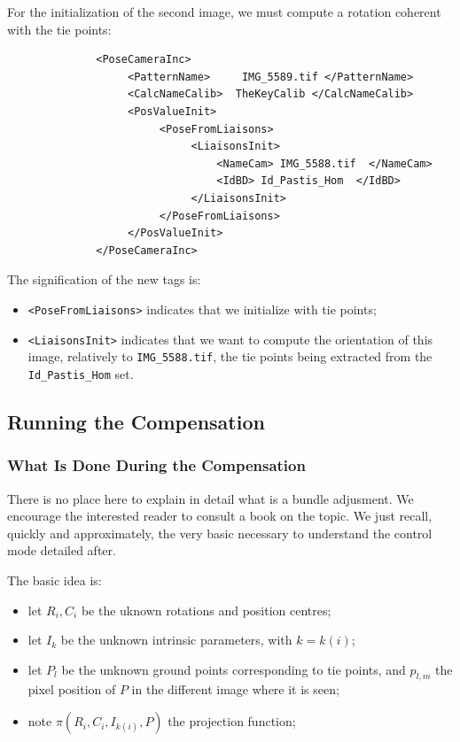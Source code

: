 For the initialization of the second image, we must compute
a rotation coherent with the tie points:


{\scriptsize
\begin{verbatim}
              <PoseCameraInc>
                   <PatternName>     IMG_5589.tif </PatternName>
                   <CalcNameCalib>  TheKeyCalib </CalcNameCalib>
                   <PosValueInit>
                        <PoseFromLiaisons>
                             <LiaisonsInit>
                                 <NameCam> IMG_5588.tif  </NameCam>
                                 <IdBD> Id_Pastis_Hom  </IdBD>
                             </LiaisonsInit>
                        </PoseFromLiaisons>
                   </PosValueInit>
              </PoseCameraInc>
\end{verbatim}
}

The signification of the new tags is:

\begin{itemize}
   \item {\tt <PoseFromLiaisons>} indicates that we initialize with tie points;
   \item {\tt <LiaisonsInit>} indicates that we want to compute the orientation
         of this image, relatively to {\tt IMG\_5588.tif}, the tie points
         being extracted from the {\tt Id\_Pastis\_Hom} set.
\end{itemize}


\subsection{Running the Compensation}

\subsubsection{What Is Done During the Compensation}

There is no place here to explain in detail what is a bundle adjusment.
We encourage  the interested  reader to consult a book
on the topic.  We just recall, quickly and approximately,
the very basic necessary to understand the control mode
detailed after.

The basic idea is:

\begin{itemize}
   \item let $R_i,C_i$  be the uknown  rotations and position centres;
   \item let  $I_k$ be the unknown intrinsic parameters, with $k=k(i)$;
   \item let  $P_l$ be the unknown ground points corresponding to tie points,
         and $p_{l,m}$ the pixel position of $P$ in the different image where
         it is seen;
   \item note $\pi(R_i,C_i,I_{k(i)},P)$   the projection function;
\end{itemize}


